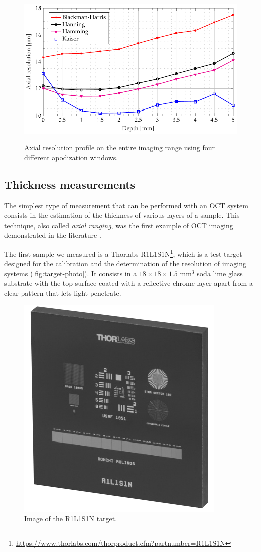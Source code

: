 \begin{figure}[hbt]
	\myfloatalign
	{\includegraphics[width=0.8\linewidth]{gfx/ch3/risoluzione-profondita}}
	\caption{Axial resolution profile on the entire imaging range using four different apodization windows.}\label{fig:axial-resolution-depth}
\end{figure}


\subsection{Thickness measurements}\label{sub:thickness-measurements}
The simplest type of measurement that can be performed with an OCT system consists in the estimation of the thickness of various layers of a sample. This technique, also called \emph{axial ranging}, was the first example of OCT imaging demonstrated in the literature \cite{Fujimoto1986}. 

The first sample we measured is a Thorlabs R1L1S1N\footnote{\url{https://www.thorlabs.com/thorproduct.cfm?partnumber=R1L1S1N}}, which is a test target designed for the calibration and the determination of the resolution of imaging systems (\autoref{fig:target-photo}). It consists in a $18\times18\times1.5$ mm$^3$ soda lime glass substrate with the top surface coated with a reflective chrome layer apart from a clear pattern that lets light penetrate. 


\begin{figure}
	\myfloatalign
	\includegraphics[width=0.3\linewidth]{gfx/ch3/target}
	\caption{Image of the R1L1S1N target.}\label{fig:target-photo}
\end{figure}


